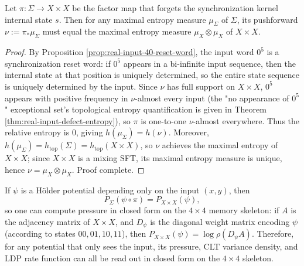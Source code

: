 \begin{proposition}\label{prop:real-input-40-input-measure-rigid}
Let $\pi:\Sigma\to X\times X$ be the factor map that forgets the synchronization kernel internal state $s$. Then for any maximal entropy measure $\mu_\Sigma$ of $\Sigma$,
its pushforward $\nu:=\pi_\ast\mu_\Sigma$ must equal the maximal entropy measure $\mu_X\otimes\mu_X$ of $X\times X$.
\end{proposition}
\begin{proof}
By Proposition \ref{prop:real-input-40-reset-word}, the input word $0^5$ is a synchronization reset word: if $0^5$ appears in a bi-infinite input sequence,
then the internal state at that position is uniquely determined, so the entire state sequence is uniquely determined by the input.
Since $\nu$ has full support on $X\times X$, $0^5$ appears with positive frequency in $\nu$-almost every input (the "no appearance of $0^5$" exceptional set's topological entropy quantification is given in Theorem \ref{thm:real-input-defect-entropy}),
so $\pi$ is one-to-one $\nu$-almost everywhere. Thus the relative entropy is $0$, giving
\(
h(\mu_\Sigma)=h(\nu).
\)
Moreover, $h(\mu_\Sigma)=h_{\mathrm{top}}(\Sigma)=h_{\mathrm{top}}(X\times X)$,
so $\nu$ achieves the maximal entropy of $X\times X$; since $X\times X$ is a mixing SFT, its maximal entropy measure is unique,
hence $\nu=\mu_X\otimes\mu_X$. Proof complete.
\end{proof}

\begin{corollary}\label{cor:real-input-40-input-potential-reduction}
If $\psi$ is a Hölder potential depending only on the input $(x,y)$, then
\[
P_\Sigma(\psi\circ\pi)=P_{X\times X}(\psi),
\]
so one can compute pressure in closed form on the $4\times 4$ memory skeleton: if $A$ is the adjacency matrix of $X\times X$,
and $D_\psi$ is the diagonal weight matrix encoding $\psi$ (according to states $00,01,10,11$), then
\(
P_{X\times X}(\psi)=\log\rho(D_\psi A)
\).
Therefore, for any potential that only sees the input, its pressure, CLT variance density, and LDP rate function can all be read out in closed form on the $4\times 4$ skeleton.
\end{corollary}

